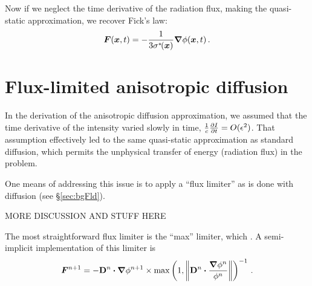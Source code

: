Now if we neglect the time derivative of the radiation flux, making the
quasi-static approximation, we recover Fick's law:
\begin{equation*}
\bm{F}(\bm{x}, t) = -\frac{1}{3\sigma^{*\!}(\bm{x})} \bm{\nabla}\phi(\bm{x}, t) \,.
\end{equation*}

\section{Flux-limited anisotropic diffusion}

In the derivation of the anisotropic diffusion approximation, we assumed that
the time derivative of the intensity varied slowly in time,
$\frac{1}{c}\frac{\partial I}{\partial t} = O(\epsilon^2)$. That assumption effectively led to
the same quasi-static approximation as standard diffusion, which permits the
unphysical transfer of energy (radiation flux) in the problem.

One means of addressing this issue is to apply a ``flux limiter'' as is done
with diffusion (see \S\ref{sec:bgFld}).

MORE DISCUSSION AND STUFF HERE

The most straightforward flux limiter is the ``max'' limiter, which . A
semi-implicit implementation of this limiter is
\begin{equation*}
  \bm{F}^{n+1} = -\mathbf{D}^{n}\bm{\cdot} \bm{\nabla} \phi^{n+1} \times 
  \max\left( 1, \left\| \mathbf{D}^{n}\bm{\cdot} \frac{\bm{\nabla} \phi^{n}}{\phi^{n}} \right\|
  \right)^{-1} \,.
\end{equation*}

